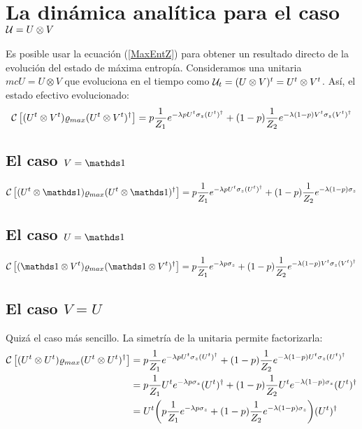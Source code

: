 \section{La dinámica analítica para el caso $\mathcal{U}=U\otimes V$}
Es posible usar la ecuación (\ref{MaxEntZ}) para obtener un resultado directo de la evolución del estado de máxima entropía. Consideramos una unitaria $mcU=U\otimes V$ que evoluciona en el tiempo como $\mathcal{U}_{t}=(U\otimes V)^{t}=U^{t}\otimes V^{t}$. Así, el estado efectivo evolucionado:
\begin{equation}\label{eq:SeparableDynamics}
\mathcal{C}\left[(U^{t}\otimes V^{t})\varrho_{max}(U^{t}\otimes V^{t})^{\dag}\right]=p\frac{1}{Z_{1}}e^{-\lambda p U^{t}\sigma_{z}(U^t)^{\dag}}+(1-p)\frac{1}{Z_{2}}e^{-\lambda (1-p)V^{t}\sigma_{z}(V^t)^{\dag}}
\end{equation}
\subsection{El caso $V=\Id$}
\begin{equation}\label{eq:SeparableDynamicsUxI}
\CG{(U^{t}\otimes \Id)\varrho_{max}(U^{t}\otimes \Id)^{\dag}}=p\frac{1}{Z_{1}}e^{-\lambda p U^{t}\sigma_{z}(U^t)^{\dag}}+(1-p)\frac{1}{Z_{2}}e^{-\lambda (1-p)\sigma_{z}}
\end{equation}
\subsection{El caso $U=\Id$}
\begin{equation}\label{eq:SeparableDynamicsIxU}
\CG{(\Id\otimes V^{t} )\varrho_{max}(\Id\otimes V^{t})^{\dag}}=p\frac{1}{Z_{1}}e^{-\lambda p \sigma_{z}}+(1-p)\frac{1}{Z_{2}}e^{-\lambda (1-p)V^{t}\sigma_{z}(V^t)^{\dag}}
\end{equation}
\subsection{El caso $V=U$}
Quizá el caso más sencillo. La simetría de la unitaria permite factorizarla:
\begin{align*}
\mathcal{C}\left[(U^{t}\otimes U^{t})\varrho_{max}(U^{t}\otimes U^{t})^{\dag}\right]&=p\frac{1}{Z_{1}}e^{-\lambda p U^{t}\sigma_{z}(U^t)^{\dag}}+(1-p)\frac{1}{Z_{2}}e^{-\lambda (1-p)U^{t}\sigma_{z}(U^t)^{\dag}}\\
&=p\frac{1}{Z_{1}}U^{t}e^{-\lambda p \sigma_{z}}(U^t)^{\dag}+(1-p)\frac{1}{Z_{2}}U^{t}e^{-\lambda (1-p)\sigma_{z}}(U^t)^{\dag}\\
&=U^{t}\qty(p\frac{1}{Z_{1}}e^{-\lambda p \sigma_{z}}+(1-p)\frac{1}{Z_{2}}e^{-\lambda (1-p)\sigma_{z}})(U^t)^{\dag}\\
\end{align*}